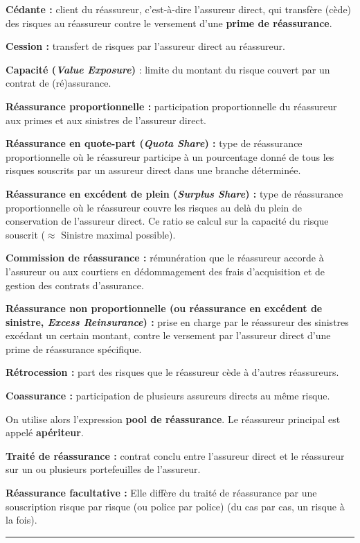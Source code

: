 
\begin{f}

\textbf{Cédante :} client du réassureur, c'est-à-dire l'assureur direct, qui transfère (cède) des risques au réassureur contre le versement
d'une \textbf{prime de réassurance}.

\textbf{Cession :} transfert de risques par l'assureur direct au réassureur.

\textbf{Capacité (\emph{Value Exposure})} : limite du montant du risque couvert par un contrat de (ré)assurance.

\textbf{Réassurance proportionnelle :} participation proportionnelle du réassureur aux primes et aux sinistres de l'assureur direct.

\textbf{Réassurance en quote-part (\emph{Quota Share}) :} type de réassurance proportionnelle où le  réassureur participe à un pourcentage donné de tous les risques souscrits par un assureur direct dans une branche déterminée.

\textbf{Réassurance en excédent de plein (\emph{Surplus Share}) :} type de réassurance proportionnelle où le  réassureur couvre les risques au delà du plein de
conservation de l'assureur direct. Ce ratio se calcul sur la capacité du risque souscrit (\(\approx\) Sinistre maximal possible).

\textbf{Commission de réassurance :} rémunération que le réassureur accorde à l'assureur ou aux courtiers en dédommagement des frais d'acquisition et de gestion des contrats d'assurance.

\textbf{Réassurance non proportionnelle (ou réassurance en excédent de sinistre, \emph{Excess Reinsurance}) :}
 prise en charge par le réassureur des sinistres excédant un certain montant, contre le versement par l'assureur direct d'une prime de réassurance spécifique.

\textbf{Rétrocession :}  part des risques que le réassureur cède à d'autres réassureurs.

\textbf{Coassurance :} participation de plusieurs assureurs directs au même risque.

On utilise alors l'expression \textbf{pool de réassurance}. 
Le réassureur principal est appelé \textbf{apériteur}. 

\textbf{Traité de réassurance :} contrat conclu entre l'assureur direct et le réassureur sur un ou plusieurs portefeuilles de l'assureur.

\textbf{Réassurance facultative :}
Elle diffère du traité de réassurance par une souscription risque par risque (ou police par police) (du cas par cas, un risque à la fois). 

\end{f}
\hrule




